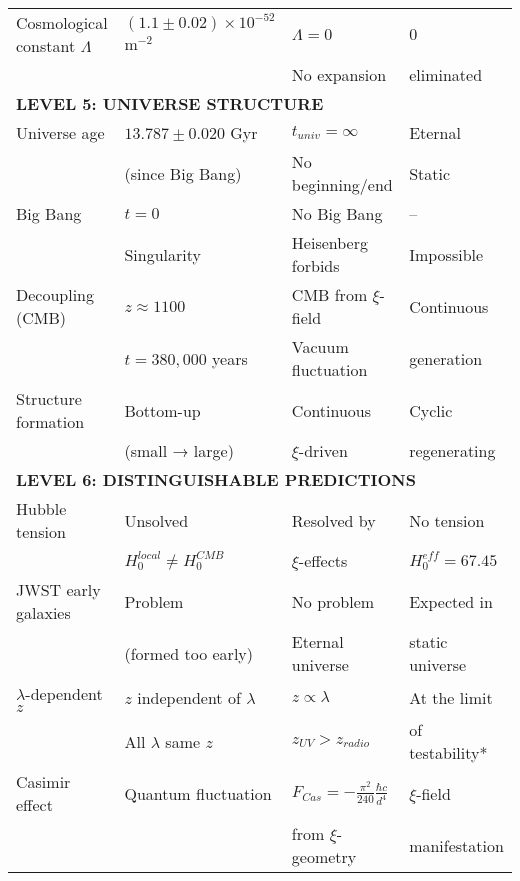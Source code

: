\documentclass[12pt,a4paper]{article}
\begin{document}
\begin{longtable}{p{5cm}p{4cm}p{3.5cm}p{3.5cm}}
	Cosmological constant $\Lambda$ & $(1.1 \pm 0.02) \times 10^{-52}$ m$^{-2}$ & $\Lambda = 0$ & $0$ \\
	& & No expansion & eliminated \\[0.3em]
	
	\midrule
	\multicolumn{4}{l}{\textbf{LEVEL 5: UNIVERSE STRUCTURE}} \\
	\midrule
	
	Universe age & $13.787 \pm 0.020$ Gyr & $t_{univ} = \infty$ & Eternal \\
	& (since Big Bang) & No beginning/end & Static \\[0.3em]
	
	Big Bang & $t = 0$ & No Big Bang & -- \\
	& Singularity & Heisenberg forbids & Impossible \\[0.3em]
	
	Decoupling (CMB) & $z \approx 1100$ & CMB from $\xi$-field & Continuous \\
	& $t = 380,000$ years & Vacuum fluctuation & generation \\[0.3em]
	
	Structure formation & Bottom-up & Continuous & Cyclic \\
	& (small → large) & $\xi$-driven & regenerating \\[0.3em]
	
	\midrule
	\multicolumn{4}{l}{\textbf{LEVEL 6: DISTINGUISHABLE PREDICTIONS}} \\
	\midrule
	
	Hubble tension & Unsolved & Resolved by & No tension \\
	& $H_0^{local} \neq H_0^{CMB}$ & $\xi$-effects & $H_0^{eff} = 67.45$ \\[0.3em]
	
	JWST early galaxies & Problem & No problem & Expected in \\
	& (formed too early) & Eternal universe & static universe \\[0.3em]
	
	$\lambda$-dependent $z$ & $z$ independent of $\lambda$ & $z \propto \lambda$ & At the limit \\
	& All $\lambda$ same $z$ & $z_{UV} > z_{radio}$ & of testability* \\[0.3em]
	
	Casimir effect & Quantum fluctuation & $F_{Cas} = -\frac{\pi^2}{240} \frac{\hbar c}{d^4}$ & $\xi$-field \\
	& & from $\xi$-geometry & manifestation \\[0.3em]
	

\end{longtable}
\end{document}
